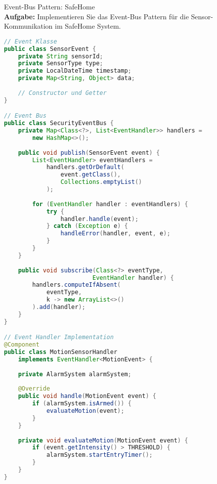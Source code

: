 \begin{example2}[breakable]{Event-Bus Pattern: SafeHome}\\
\textbf{Aufgabe:} Implementieren Sie das Event-Bus Pattern für die Sensor-Kommunikation im SafeHome System.

\begin{lstlisting}[language=Java, style=basesmol]
// Event Klasse
public class SensorEvent {
    private String sensorId;
    private SensorType type;
    private LocalDateTime timestamp;
    private Map<String, Object> data;
    
    // Constructor und Getter
}

// Event Bus
public class SecurityEventBus {
    private Map<Class<?>, List<EventHandler>> handlers = 
        new HashMap<>();
    
    public void publish(SensorEvent event) {
        List<EventHandler> eventHandlers = 
            handlers.getOrDefault(
                event.getClass(), 
                Collections.emptyList()
            );
        
        for (EventHandler handler : eventHandlers) {
            try {
                handler.handle(event);
            } catch (Exception e) {
                handleError(handler, event, e);
            }
        }
    }
    
    public void subscribe(Class<?> eventType, 
                         EventHandler handler) {
        handlers.computeIfAbsent(
            eventType, 
            k -> new ArrayList<>()
        ).add(handler);
    }
}

// Event Handler Implementation
@Component
public class MotionSensorHandler 
    implements EventHandler<MotionEvent> {
    
    private AlarmSystem alarmSystem;
    
    @Override
    public void handle(MotionEvent event) {
        if (alarmSystem.isArmed()) {
            evaluateMotion(event);
        }
    }
    
    private void evaluateMotion(MotionEvent event) {
        if (event.getIntensity() > THRESHOLD) {
            alarmSystem.startEntryTimer();
        }
    }
}
\end{lstlisting}
\end{example2}

